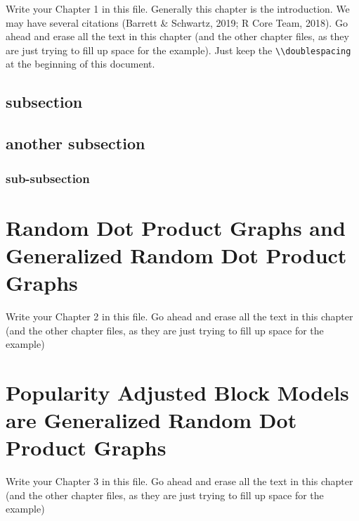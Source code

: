 \documentclass{DissertateUSU}
\begin{document}
Write your Chapter 1 in this file. Generally this chapter is the
introduction. We may have several citations (Barrett \& Schwartz, 2019;
R Core Team, 2018). Go ahead and erase all the text in this chapter (and
the other chapter files, as they are just trying to fill up space for
the example). Just keep the
\texttt{\textbackslash{}\textbackslash{}doublespacing} at the beginning
of this document.

\hypertarget{subsection}{%
\section{subsection}\label{subsection}}

\hypertarget{another-subsection}{%
\section{another subsection}\label{another-subsection}}

\hypertarget{sub-subsection}{%
\subsection{sub-subsection}\label{sub-subsection}}

\FloatBarrier
\newpage
\fancyhead[R]{\thepage}
\fancyfoot[C]{}

\chapter{Random Dot Product Graphs and Generalized Random Dot Product Graphs}

\doublespacing

Write your Chapter 2 in this file. Go ahead and erase all the text in
this chapter (and the other chapter files, as they are just trying to
fill up space for the example)

\lipsum

\FloatBarrier
\newpage
\fancyhead[R]{\thepage}
\fancyfoot[C]{}

\chapter{Popularity Adjusted Block Models are Generalized Random Dot Product Graphs}

\doublespacing

Write your Chapter 3 in this file. Go ahead and erase all the text in
this chapter (and the other chapter files, as they are just trying to
fill up space for the example)
\end{document}
